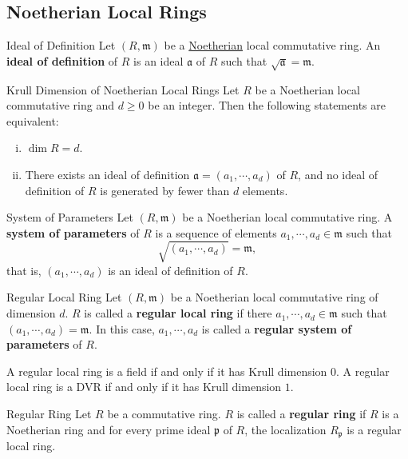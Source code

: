 \subsection{Noetherian Local Rings}

\begin{definition}{Ideal of Definition}{}
Let $(R,\mathfrak{m})$ be a \hyperlink{th:Noetherian_commutative_ring}{Noetherian} local commutative ring. An \textbf{ideal of definition} of $R$ is an ideal $\mathfrak{a}$ of $R$ such that $\sqrt{\mathfrak{a}}=\mathfrak{m}$.
\end{definition}


\begin{proposition}{Krull Dimension of Noetherian Local Rings}{}
    Let $R$ be a Noetherian local commutative ring and $d\ge 0$ be an integer. Then the following statements are equivalent:
    \begin{enumerate}[(i)]
        \item $\dim R=d$.
        \item There exists an ideal of definition $\mathfrak{a}=(a_1,\cdots,a_d)$ of $R$, and no ideal of definition of $R$ is generated by fewer than $d$ elements.
    \end{enumerate}
\end{proposition}

\begin{definition}{System of Parameters}{}
    Let $(R,\mathfrak{m})$ be a Noetherian local commutative ring. A \textbf{system of parameters} of $R$ is a sequence of elements $a_1,\cdots,a_d\in \mathfrak{m}$ such that 
    \[
    \sqrt{(a_1,\cdots,a_d)}=\mathfrak{m},
    \]
    that is, $(a_1,\cdots,a_d)$ is an ideal of definition of $R$.
\end{definition}

\begin{definition}{Regular Local Ring}{}
    Let $(R,\mathfrak{m})$ be a Noetherian local commutative ring of dimension $d$. $R$ is called a \textbf{regular local ring} if there $a_1,\cdots,a_d\in \mathfrak{m}$ such that $(a_1,\cdots,a_d)=\mathfrak{m}$. In this case, $a_1,\cdots,a_d$ is called a \textbf{regular system of parameters} of $R$.
    
\end{definition}

A regular local ring is a field if and only if it has Krull dimension $0$. A regular local ring is a DVR if and only if it has Krull dimension $1$.

\begin{definition}{Regular Ring}{}
    Let $R$ be a commutative ring. $R$ is called a \textbf{regular ring} if $R$ is a Noetherian ring and for every prime ideal $\mathfrak{p}$ of $R$, the localization $R_{\mathfrak{p}}$ is a regular local ring.
    
\end{definition}

